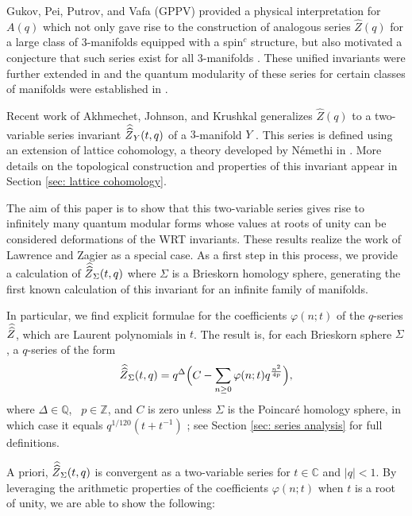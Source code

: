 \documentclass[11pt,letterpaper]{amsart}
\theoremstyle{definition}
\theoremstyle{plain}
\newcommand{\Zhat}{\widehat{Z}}
\newcommand{\Zhathat}{\widehat{\vphantom{\rule{5pt}{10pt}}\smash{\widehat{Z}}\,}\!}
\numberwithin{equation}{section}
\theoremstyle{example}
\begin{document}
Gukov, Pei, Putrov, and Vafa (GPPV) provided a physical interpretation for $A(q)$ which not only gave rise to the construction of analogous series $\Zhat(q)$ for a large class of $3$-manifolds  equipped with a spin$^{c}$ structure, but also motivated a conjecture that such series exist for all $3$-manifolds \cite{gppv,gukov_2017}. These unified invariants were further extended in \cite{gukovmanolescu, gukovmodularity} and the quantum modularity of these series for certain classes of manifolds were established in \cite{bringmannquantum1, bringmannquantum2}.

Recent work of Akhmechet, Johnson, and Krushkal generalizes $\Zhat(q)$ to a two-variable series invariant $\Zhathat_{Y}(t,q)$ of a $3$-manifold $Y$ \cite{latticecohomology}. This series is defined using an extension of lattice cohomology, a theory developed by N\'emethi in \cite{nemethi}. More details on the topological construction and properties of this invariant appear in Section \ref{sec: lattice cohomology}.

The aim of this paper is to show that this two-variable series gives rise to infinitely many quantum modular forms whose values at roots of unity can be considered deformations of the WRT invariants. These results realize the work of Lawrence and Zagier as a special case. As a first step in this process, we provide a calculation of $\Zhathat_{\Sigma}(t,q)$ where $\Sigma$ is a Brieskorn homology sphere, generating the first known calculation of this invariant for an infinite family of manifolds.

In particular, we find explicit formulae for the coefficients $\varphi(n;t)$ of the $q$-series $\Zhathat$, which are Laurent polynomials in $t$. The result is, for each Brieskorn sphere $\Sigma$,
a $q$-series of the form
\begin{equation}\label{eqn:qseries} \Zhathat_\Sigma(t,q) = q^\Delta \Big( C - \sum_{n \geq 0} \varphi(n;t)q^\frac{n^2}{4p} \Big),\end{equation}
where $\Delta \in \mathbb{Q}$, \ $p \in \mathbb{Z}$, and $C$ is zero unless $\Sigma$ is the Poincar\'e homology sphere, in which case it equals $q^{1/120}(t+t^{-1})$
; see Section \ref{sec: series analysis} for full definitions.

A priori, $\Zhathat_\Sigma(t,q)$ is convergent as a two-variable series for $t \in \mathbb{C}$ and $|q| < 1$. By leveraging the arithmetic properties of the coefficients $\varphi(n;t)$ when $t$ is a root of unity, we are able to show the following:
\end{document}
